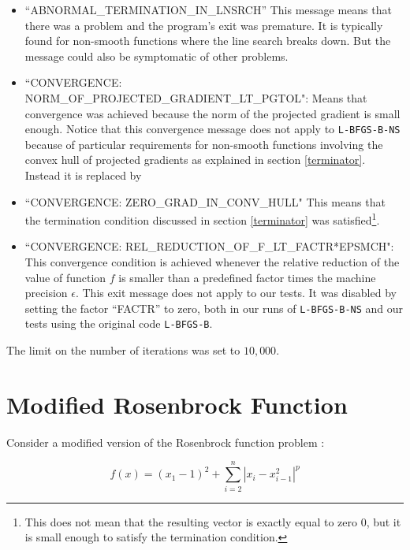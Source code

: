 \begin{itemize}

\item ``ABNORMAL\_TERMINATION\_IN\_LNSRCH'' This message means that there was a problem and the program's exit was premature. It is typically found for non-smooth functions where the line search breaks down. But the message could also be symptomatic of other problems.

\item ``CONVERGENCE: NORM\_OF\_PROJECTED\_GRADIENT\_LT\_PGTOL": Means that convergence was achieved because the norm of the projected gradient is small enough. Notice that this convergence message does not apply to \texttt{L-BFGS-B-NS} because of particular requirements for non-smooth functions involving the convex hull of projected gradients as explained in section \ref{terminator}. Instead it is replaced by

\item ``CONVERGENCE: ZERO\_GRAD\_IN\_CONV\_HULL" This means that the termination condition discussed in section \ref{terminator} was satisfied\footnote{This does not mean that the resulting vector is exactly equal to zero $0$, but it is small enough to satisfy the termination condition.}.

\item ``CONVERGENCE: REL\_REDUCTION\_OF\_F\_LT\_FACTR*EPSMCH": This convergence condition is achieved whenever the relative reduction of the value of function $f$ is smaller than a predefined factor times the machine precision $\epsilon$. This exit message does not apply to our tests. It was disabled by setting the factor ``FACTR'' to zero, both in our runs of \texttt{L-BFGS-B-NS} and our tests using the original code \texttt{L-BFGS-B}.

\end{itemize}

The limit on the number of iterations was set to $10,000$.

\section{Modified Rosenbrock Function} \label{ros}

Consider a modified version of the Rosenbrock function problem \citep{rosenbrock}:

\begin{equation} \label{modifiedrosenbrock}
    f(x) = (x_1 - 1)^2 + \sum_{i = 2}^n |x_i - x_{i - 1}^2|^p
\end{equation}

